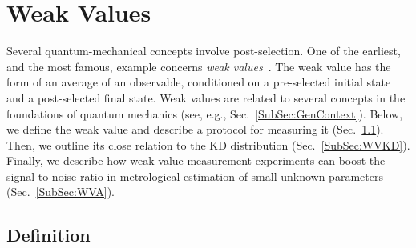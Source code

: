 \documentclass[%
 reprint,
superscriptaddress,
nofootinbib,
bibnotes,
 amsmath,amssymb,
 aps,
]{revtex4-1}
\theoremstyle{plain}
\begin{document}
\section{Weak Values} \label{sec:wv}
\label{Sec:WeakValues}

Several quantum-mechanical concepts involve post-selection. One of the earliest, and the most famous, example concerns \textit{weak values}~\cite{Aharanov88,Duck89,Tamir13, Dressel14}. The weak value has the form of  an average of an observable, conditioned on a pre-selected initial state and a post-selected final state. Weak values are related to several concepts in the foundations of quantum mechanics (see, e.g., Sec.~\ref{SubSec:GenContext}). Below, we define the weak value and describe a protocol for measuring it (Sec.~\ref{SubSec:WVDefs}). Then, we outline its close relation to the KD distribution (Sec.~\ref{SubSec:WVKD}). Finally, we describe how weak-value-measurement experiments 
can boost the signal-to-noise ratio in metrological estimation of  small unknown parameters (Sec.~\ref{SubSec:WVA}). 

\subsection{Definition}
\label{SubSec:WVDefs}
\end{document}
